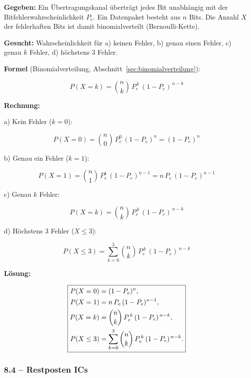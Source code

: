\begin{beispiel}

\textbf{Gegeben:} Ein Übertragungskanal überträgt jedes Bit unabhängig mit der
Bitfehlerwahrscheinlichkeit $P_e$. Ein Datenpaket besteht aus $n$ Bits. Die
Anzahl $X$ der fehlerhaften Bits ist damit binomialverteilt (Bernoulli-Kette).

\textbf{Gesucht:} Wahrscheinlichkeit für a) keinen Fehler, b) genau einen
Fehler, c) genau $k$ Fehler, d) höchstens $3$ Fehler.

\textbf{Formel} (Binomialverteilung, Abschnitt~\ref{sec:binomialverteilung}):

$$
P(X = k) = \binom{n}{k}\, P_e^{\,k}\,(1 - P_e)^{\,n-k}
$$

\textbf{Rechnung:}

a) Kein Fehler ($k = 0$):

$$
P(X = 0) = \binom{n}{0}\, P_e^{0}\,(1 - P_e)^{n} = (1 - P_e)^{n}
$$

b) Genau ein Fehler ($k = 1$):

$$
P(X = 1) = \binom{n}{1}\, P_e^{1}\,(1 - P_e)^{n-1} = n\,P_e\,(1 - P_e)^{n-1}
$$

c) Genau $k$ Fehler:

$$
P(X = k) = \binom{n}{k}\, P_e^{\,k}\,(1 - P_e)^{\,n-k}
$$

d) Höchstens $3$ Fehler ($X \le 3$):

$$
P(X \le 3) = \sum_{k=0}^{3} \binom{n}{k}\, P_e^{\,k}\,(1 - P_e)^{\,n-k}
$$

\textbf{Lösung:}

$$
\boxed{%
\begin{aligned}
P(X = 0) &= (1 - P_e)^{n}, \\
P(X = 1) &= n\,P_e\,(1 - P_e)^{n-1}, \\
P(X = k) &= \binom{n}{k}\, P_e^{\,k}\,(1 - P_e)^{\,n-k}, \\
P(X \le 3) &= \sum_{k=0}^{3} \binom{n}{k}\, P_e^{\,k}\,(1 - P_e)^{\,n-k} .
\end{aligned}}
$$

\end{beispiel}

\subsubsection*{8.4 – Restposten ICs}


